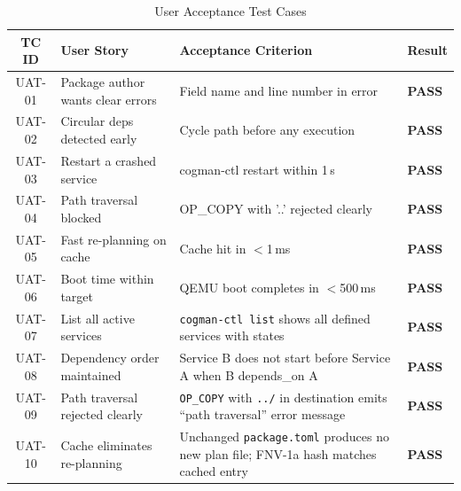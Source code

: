 \documentclass[12pt,a4paper]{report}
\begin{document}
\begin{table}[H]
\centering
\caption{User Acceptance Test Cases}
\renewcommand{\arraystretch}{1.2}
\begin{tabularx}{\linewidth}{c X X >{\centering\arraybackslash}p{1.2cm}}
\toprule
\textbf{TC ID} & \textbf{User Story} & \textbf{Acceptance Criterion} & \textbf{Result}\\
\midrule
UAT-01 & Package author wants clear errors  & Field name and line number in error     & \textbf{PASS}\\
UAT-02 & Circular deps detected early       & Cycle path before any execution         & \textbf{PASS}\\
UAT-03 & Restart a crashed service          & cogman-ctl restart within 1\,s      & \textbf{PASS}\\
UAT-04 & Path traversal blocked             & OP\_COPY with '..' rejected clearly     & \textbf{PASS}\\
UAT-05 & Fast re-planning on cache          & Cache hit in $<$1\,ms               & \textbf{PASS}\\
UAT-06 & Boot time within target            & QEMU boot completes in $<$500\,ms   & \textbf{PASS}\\
UAT-07 & List all active services           & \texttt{cogman-ctl list} shows all defined services with states & \textbf{PASS}\\
UAT-08 & Dependency order maintained        & Service B does not start before Service A when B depends\_on A & \textbf{PASS}\\
UAT-09 & Path traversal rejected clearly    & \texttt{OP\_COPY} with \texttt{../} in destination emits ``path traversal'' error message & \textbf{PASS}\\
UAT-10 & Cache eliminates re-planning       & Unchanged \texttt{package.toml} produces no new plan file; FNV-1a hash matches cached entry & \textbf{PASS}\\
\bottomrule
\end{tabularx}
\end{table}
\end{document}
